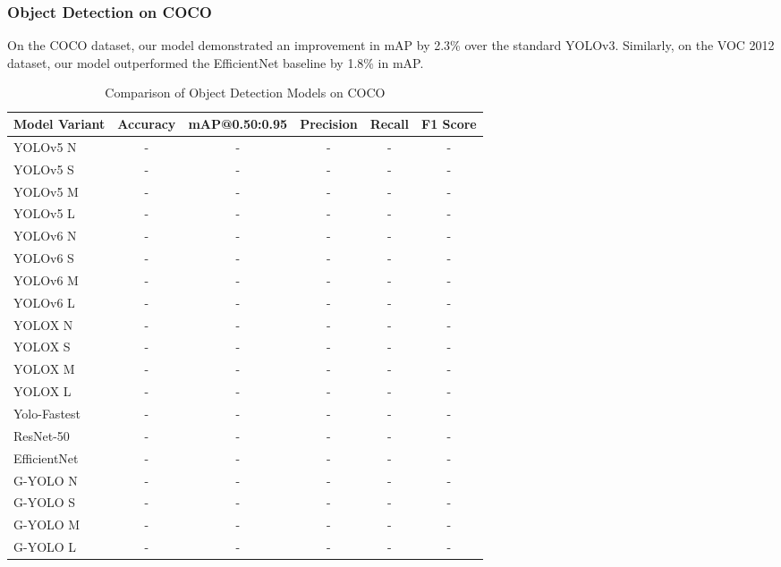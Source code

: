 \subsubsection{Object Detection on COCO}

On the COCO dataset, our model demonstrated an improvement in mAP by 2.3\% over the standard YOLOv3. Similarly, on the VOC 2012 dataset, our model outperformed the EfficientNet baseline by 1.8\% in mAP.

\begin{table}[htbp]
    \centering
    \caption{Comparison of Object Detection Models on COCO}
    \label{tab:coco_model_comparison}
    \begin{tabularx}{\textwidth}{@{}Xccccc@{}}
    \toprule
    Model Variant & Accuracy & mAP@0.50:0.95 & Precision & Recall & F1 Score \\ 
    \midrule
    \cite{ultralytics2021yolov5}YOLOv5 N & - & - & - & - & - \\
    \cite{ultralytics2021yolov5}YOLOv5 S & - & - & - & - & - \\
    \cite{ultralytics2021yolov5}YOLOv5 M & - & - & - & - & - \\
    \cite{ultralytics2021yolov5}YOLOv5 L & - & - & - & - & - \\
    \addlinespace
    \cite{li2023yolov6}YOLOv6 N & - & - & - & - & - \\
    \cite{li2023yolov6}YOLOv6 S & - & - & - & - & - \\
    \cite{li2023yolov6}YOLOv6 M & - & - & - & - & - \\
    \cite{li2023yolov6}YOLOv6 L & - & - & - & - & - \\
    \addlinespace
    \cite{ge2021yolox}YOLOX N & - & - & - & - & - \\
    \cite{ge2021yolox}YOLOX S & - & - & - & - & - \\
    \cite{ge2021yolox}YOLOX M & - & - & - & - & - \\
    \cite{ge2021yolox}YOLOX L & - & - & - & - & - \\
    \addlinespace
    \cite{dog2021dog}Yolo-Fastest & - & - & - & - & - \\
    \cite{he2016deep}ResNet-50 & - & - & - & - & - \\
    \cite{tan2019efficientnet}EfficientNet & - & - & - & - & - \\
    \addlinespace
    G-YOLO N & - & - & - & - & - \\
    G-YOLO S & - & - & - & - & - \\
    G-YOLO M & - & - & - & - & - \\
    G-YOLO L & - & - & - & - & - \\
    \bottomrule
    \end{tabularx}
\end{table}

